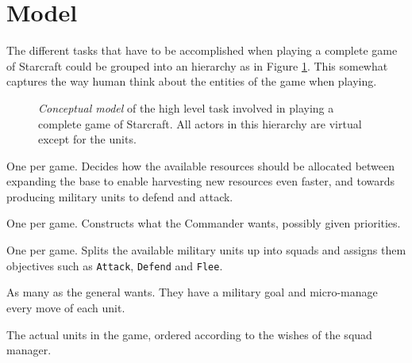 \section{Model}
The different tasks that have to be accomplished when playing a complete game of Starcraft could be grouped into an hierarchy as in Figure \ref{conceptualModel}. This somewhat captures the way human think about the entities of the game when playing.

\begin{figure}[h!t]
\centering
{}
\caption{
\emph{Conceptual model} of the high level task involved in playing a complete game of Starcraft. All actors in this hierarchy are virtual except for the units.
}
\label{conceptualModel}
\end{figure}

\begin{definition}[Commander]
One per game. Decides how the available resources should be allocated between expanding the base to enable harvesting new resources even faster, and towards producing military units to defend and attack.
\end{definition}
\begin{definition}
One per game. Constructs what the Commander wants, possibly given priorities.
\end{definition}
\begin{definition}[General]
One per game. Splits the available military units up into squads and assigns them objectives such as \texttt{Attack}, \texttt{Defend} and \texttt{Flee}.
\end{definition}
\begin{definition}[Squad]
As many as the general wants. They have a military goal and micro-manage every move of each unit.
\end{definition}
\begin{definition}[Unit]
The actual units in the game, ordered according to the wishes of the squad manager.
\end{definition}
